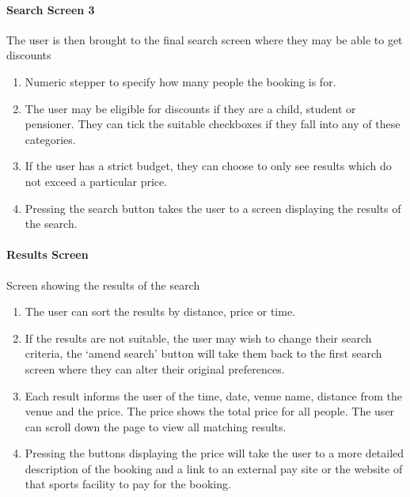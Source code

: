 \paragraph{Search Screen 3}
The user is then brought to the final search screen where they may be able to
get discounts

\begin{enumerate}
	\item Numeric stepper to specify how many people the booking is for.
	\item The user may be eligible for discounts if they are a child, student
		or pensioner. They can tick the suitable checkboxes if they fall into
		any of these categories.
	\item If the user has a strict budget, they can choose to only see results
		which do not exceed a  particular price.
	\item Pressing the search button takes the user to a screen displaying the
		results of the search.
\end{enumerate}

\paragraph{Results Screen}
Screen showing the results of the search

\begin{enumerate}
	\item The user can sort the results by distance, price or time.
	\item If the results are not suitable, the user may wish to change their
		search criteria, the `amend search' button will take them back to the
		first search screen where they can alter their original preferences.
	\item Each result informs the user of the time, date, venue name, distance
		from the venue and the price. The price shows the total price for all
		people. The user can scroll down the page to view all matching results.
	\item Pressing the buttons displaying the price will take the user to a
		more detailed description of the booking and a link to an external pay
		site or the website of that sports facility to pay for the booking.
\end{enumerate}

